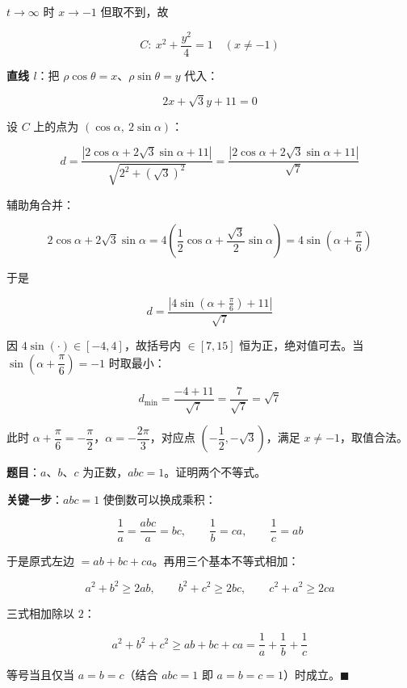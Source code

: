 $t\to\infty$ 时 $x\to-1$ 但取不到，故

\[C:\ x^{2}+\frac{y^{2}}4=1\quad(x\ne-1)\]

\textbf{直线 $l$}：把 $\rho\cos\theta=x$、$\rho\sin\theta=y$ 代入：

\[2x+\sqrt3y+11=0\]


设 $C$ 上的点为 $(\cos\alpha,\ 2\sin\alpha)$：

\[d=\frac{\left|2\cos\alpha+2\sqrt3\sin\alpha+11\right|}{\sqrt{2^{2}+\left(\sqrt3\right)^{2}}}=\frac{\left|2\cos\alpha+2\sqrt3\sin\alpha+11\right|}{\sqrt7}\]

辅助角合并：

\[2\cos\alpha+2\sqrt3\sin\alpha=4\left(\frac12\cos\alpha+\frac{\sqrt3}2\sin\alpha\right)=4\sin\left(\alpha+\frac\pi6\right)\]

于是

\[d=\frac{\left|4\sin\left(\alpha+\frac\pi6\right)+11\right|}{\sqrt7}\]

因 $4\sin(\cdot)\in[-4,4]$，故括号内 $\in[7,15]$ 恒为正，绝对值可去。当 $\sin\left(\alpha+\dfrac\pi6\right)=-1$ 时取最小：

\[d_{\min}=\frac{-4+11}{\sqrt7}=\frac7{\sqrt7}=\sqrt7\]

此时 $\alpha+\dfrac\pi6=-\dfrac\pi2$，$\alpha=-\dfrac{2\pi}3$，对应点 $\left(-\dfrac12,-\sqrt3\right)$，满足 $x\ne-1$，取值合法。


\par\medskip


\textbf{题目}：$a$、$b$、$c$ 为正数，$abc=1$。证明两个不等式。


\textbf{关键一步}：$abc=1$ 使倒数可以换成乘积：

\[\frac1a=\frac{abc}a=bc,\qquad \frac1b=ca,\qquad \frac1c=ab\]

于是原式左边 $=ab+bc+ca$。再用三个基本不等式相加：

\[a^{2}+b^{2}\ge2ab,\qquad b^{2}+c^{2}\ge2bc,\qquad c^{2}+a^{2}\ge2ca\]

三式相加除以 $2$：

\[a^{2}+b^{2}+c^{2}\ge ab+bc+ca=\frac1a+\frac1b+\frac1c\]

等号当且仅当 $a=b=c$（结合 $abc=1$ 即 $a=b=c=1$）时成立。$\blacksquare$

